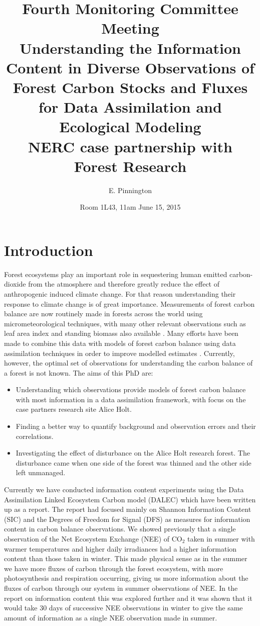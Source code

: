 \documentclass[11pt]{article}
\title{Fourth Monitoring Committee Meeting \\\vspace{4mm} \normalsize{Understanding the Information Content in Diverse Observations of Forest Carbon Stocks and Fluxes for Data Assimilation and Ecological Modeling\\ NERC case partnership with Forest Research}}
\author{\normalsize{E. Pinnington}}
\date{\normalsize{Room 1L43, 11am June 15, 2015}}
\begin{document}
\maketitle

\section{Introduction}

Forest ecosystems play an important role in sequestering human emitted carbon-dioxide from the atmosphere and therefore greatly reduce the effect of anthropogenic induced climate change. For that reason understanding their response to climate change is of great importance. Measurements of forest carbon balance are now routinely made in forests across the world using micrometeorological techniques, with many other relevant observations such as leaf area index and standing biomass also available \citep{baldocchi2008turner}. Many efforts have been made to combine this data with models of forest carbon balance using data assimilation techniques in order to improve modelled estimates \citep{fox2009reflex}. Currently, however, the optimal set of observations for understanding the carbon balance of a forest is not known. The aims of this PhD are:

\begin{itemize}
\item Understanding which observations provide models of forest carbon balance with most information in a data assimilation framework, with focus on the case partners research site Alice Holt.
\item Finding a better way to quantify background and observation errors and their correlations.
\item Investigating the effect of disturbance on the Alice Holt research forest. The disturbance came when one side of the forest was thinned and the other side left unmanaged. 
\end{itemize}

Currently we have conducted information content experiments using the Data Assimilation Linked Ecosystem Carbon model (DALEC) \citep{williams2005improved} which have been written up as a report. The report had focused mainly on Shannon Information Content (SIC) and the Degrees of Freedom for Signal (DFS) \citep{rodgers2000inverse} as measures for information content in carbon balance observations. We showed previously that a single observation of the Net Ecosystem Exchange (NEE) of CO$_2$ taken in summer with warmer temperatures and higher daily irradiances had a higher information content than those taken in winter. This made physical sense as in the summer we have more fluxes of carbon through the forest ecosystem, with more photosynthesis and respiration occurring, giving us more information about the fluxes of carbon through our system in summer observations of NEE. In the report on information content this was explored further and it was shown that it would take 30 days of successive NEE observations in winter to give the same amount of information as a single NEE observation made in summer.
\end{document}
